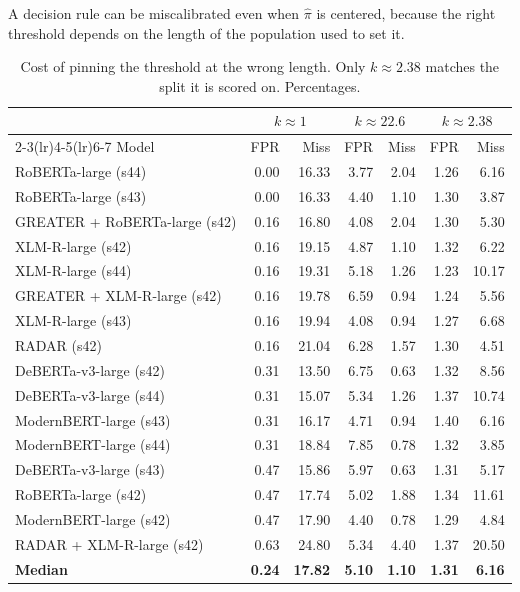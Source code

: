 \documentclass[10pt,conference,a4paper]{IEEEtran}
\begin{document}
A decision rule can be miscalibrated even when $\hat{\pi}$ is centered, because the
right threshold depends on the length of the population used to set it.
\begin{table}[t]
\caption{Cost of pinning the threshold at the wrong length. Only $k{\approx}2.38$
matches the split it is scored on. Percentages.}
\label{tab:ktransfer}
\centering
\scriptsize
\setlength{\tabcolsep}{2.5pt}
\begin{tabular}{@{}lrrrrrr@{}}
\toprule
& \multicolumn{2}{c}{$k{\approx}1$} & \multicolumn{2}{c}{$k{\approx}22.6$} & \multicolumn{2}{c}{$k{\approx}2.38$} \\
\cmidrule(lr){2-3}\cmidrule(lr){4-5}\cmidrule(lr){6-7}
Model & FPR & Miss & FPR & Miss & FPR & Miss \\
\midrule
RoBERTa-large (s44) & 0.00 & 16.33 & 3.77 & 2.04 & 1.26 & 6.16 \\
RoBERTa-large (s43) & 0.00 & 16.33 & 4.40 & 1.10 & 1.30 & 3.87 \\
GREATER + RoBERTa-large (s42) & 0.16 & 16.80 & 4.08 & 2.04 & 1.30 & 5.30 \\
XLM-R-large (s42) & 0.16 & 19.15 & 4.87 & 1.10 & 1.32 & 6.22 \\
XLM-R-large (s44) & 0.16 & 19.31 & 5.18 & 1.26 & 1.23 & 10.17 \\
GREATER + XLM-R-large (s42) & 0.16 & 19.78 & 6.59 & 0.94 & 1.24 & 5.56 \\
XLM-R-large (s43) & 0.16 & 19.94 & 4.08 & 0.94 & 1.27 & 6.68 \\
RADAR (s42) & 0.16 & 21.04 & 6.28 & 1.57 & 1.30 & 4.51 \\
DeBERTa-v3-large (s42) & 0.31 & 13.50 & 6.75 & 0.63 & 1.32 & 8.56 \\
DeBERTa-v3-large (s44) & 0.31 & 15.07 & 5.34 & 1.26 & 1.37 & 10.74 \\
ModernBERT-large (s43) & 0.31 & 16.17 & 4.71 & 0.94 & 1.40 & 6.16 \\
ModernBERT-large (s44) & 0.31 & 18.84 & 7.85 & 0.78 & 1.32 & 3.85 \\
DeBERTa-v3-large (s43) & 0.47 & 15.86 & 5.97 & 0.63 & 1.31 & 5.17 \\
RoBERTa-large (s42) & 0.47 & 17.74 & 5.02 & 1.88 & 1.34 & 11.61 \\
ModernBERT-large (s42) & 0.47 & 17.90 & 4.40 & 0.78 & 1.29 & 4.84 \\
RADAR + XLM-R-large (s42) & 0.63 & 24.80 & 5.34 & 4.40 & 1.37 & 20.50 \\
\midrule
\textbf{Median} & \textbf{0.24} & \textbf{17.82} & \textbf{5.10} & \textbf{1.10} & \textbf{1.31} & \textbf{6.16} \\
\bottomrule
\end{tabular}
\end{table}
\end{document}

